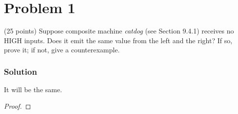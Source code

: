 
\section*{Problem 1}
(25 points) Suppose composite machine \textit{catdog} (see Section 9.4.1) receives no HIGH inputs. 
Does it emit the same value from the left and the right? 
If so, prove it; if not, give a counterexample.

\subsubsection*{Solution}

It will be the same.

\begin{proof}
    
\end{proof}